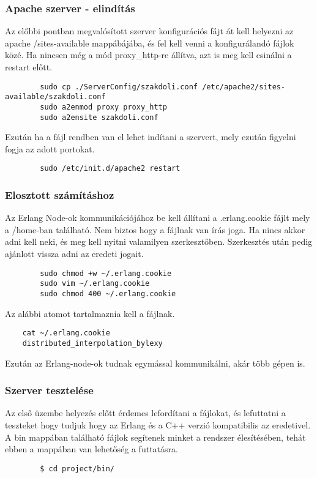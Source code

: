 \subsubsection{Apache szerver - elindítás}
	Az előbbi pontban megvalósított szerver konfigurációs fájt át kell helyezni az apache /sites-available mappábájába, és fel kell venni a konfigurálandó fájlok közé. Ha nincsen még a mód proxy\_http-re állítva, azt is meg kell csinálni a restart előtt. 
	\begin{verbatim}
		sudo cp ./ServerConfig/szakdoli.conf /etc/apache2/sites-available/szakdoli.conf
		sudo a2enmod proxy proxy_http
		sudo a2ensite szakdoli.conf
	\end{verbatim}
	Ezután ha a fájl rendben van el lehet indítani a szervert, mely ezután figyelni fogja az adott portokat.
	\begin{verbatim}
		sudo /etc/init.d/apache2 restart
	\end{verbatim}

\subsubsection{Elosztott számításhoz}
	Az Erlang Node-ok kommunikációjához be kell állítani a .erlang.cookie fájlt mely a /home-ban található. 
	Nem biztos hogy a fájlnak van írás joga. Ha nincs akkor adni kell neki, és meg kell nyitni valamilyen szerkesztőben.
	Szerkesztés után pedig ajánlott vissza adni az eredeti jogait.
	\begin{verbatim}
		sudo chmod +w ~/.erlang.cookie
		sudo vim ~/.erlang.cookie
		sudo chmod 400 ~/.erlang.cookie
	\end{verbatim}
	Az alábbi atomot tartalmaznia kell a fájlnak.
	\begin{verbatim}
	cat ~/.erlang.cookie
	distributed_interpolation_bylexy
	\end{verbatim}
	Ezután az Erlang-node-ok tudnak egymással kommunikálni, akár több gépen is.

\subsubsection{Szerver tesztelése}
	Az első üzembe helyezés előtt érdemes lefordítani a fájlokat, és lefuttatni a teszteket hogy tudjuk hogy az Erlang és a C++ verzió kompatibilis az eredetivel. \newline
	A bin mappában található fájlok segítenek minket a rendszer élesítésében, tehát ebben a mappában van lehetőség a futtatásra.  
	\begin{verbatim}
		$ cd project/bin/
	\end{verbatim}

